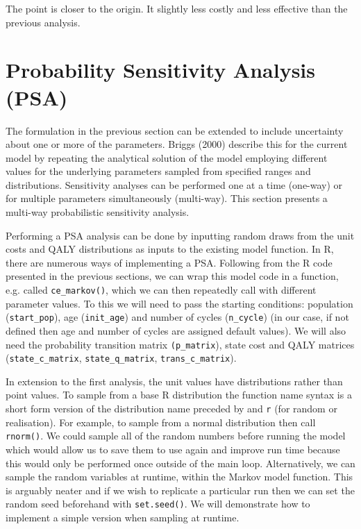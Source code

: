 \documentclass[a4paper,twoside,openany]{../svmonoBUGS}\usepackage[]{graphicx}\usepackage[]{color}
\begin{document}
The point is closer to the origin. It slightly less costly and less effective than the previous analysis.


\section{Probability Sensitivity Analysis (PSA)}
The formulation in the previous section can be extended to include uncertainty about one or more of the parameters. Briggs (2000) describe this for the current model by repeating the analytical solution of the model employing different values for the underlying parameters sampled from specified ranges and distributions. Sensitivity analyses can be performed one at a time (one-way) or for multiple parameters simultaneously (multi-way). This section presents a multi-way probabilistic sensitivity analysis. 

Performing a PSA analysis can be done by inputting random draws from the unit costs and QALY distributions as inputs to the existing model function. In R, there are numerous ways of implementing a PSA. Following from the R code presented in the previous sections, we can wrap this model code in a function, e.g. called \texttt{ce\_markov()}, which we can then repeatedly call with different parameter values. To this we will need to pass the starting conditions: population (\texttt{start\_pop}), age (\texttt{init\_age}) and number of cycles (\texttt{n\_cycle}) (in our case, if not defined then age and number of cycles are assigned default values). We will also need the probability transition matrix \texttt{(p\_matrix}), state cost and QALY matrices (\texttt{state\_c\_matrix}, \texttt{state\_q\_matrix}, \texttt{trans\_c\_matrix}).

In extension to the first analysis, the unit values have distributions rather than point values. To sample from a base R distribution the function name syntax is a short form version of the distribution name preceded by and \texttt{r} (for random or realisation). For example, to sample from a normal distribution then call \texttt{rnorm()}. We could sample all of the random numbers before running the model which would allow us to save them to use again and improve run time because this would only be performed once outside of the main loop. Alternatively, we can sample the random variables at runtime, within the Markov model function. This is arguably neater and if we wish to replicate a particular run then we can set the random seed beforehand with \texttt{set.seed()}. We will demonstrate how to implement a simple version when sampling at runtime.
\end{document}
